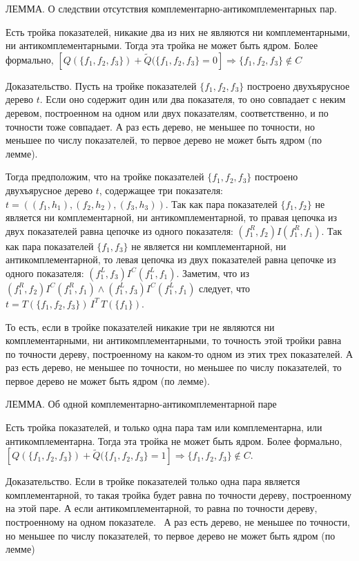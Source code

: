\documentclass[12pt]{a&t}
\begin{document}
ЛЕММА. О следствии отсутствия комплементарно-антикомплементарных пар.

Есть тройка показателей, никакие два из них не являются ни комплементарными, ни антикомплементарными. Тогда эта тройка не может быть ядром. Более формально, $[ Q(\{f_1, f_2, f_3\}) + \widetilde{Q}(\{f_1, f_2, f_3\} = 0] \Rightarrow \{f_1, f_2, f_3\} \not\in C  $


Доказательство. Пусть на тройке показателей $ \{f_1, f_2, f_3\} $ построено двухъярусное дерево $t$. Если оно содержит один или два показателя, то оно совпадает с неким деревом, построенном на одном или двух показателям, соответственно, и по точности тоже совпадает. А раз есть дерево, не меньшее по точности, но меньшее по числу показателей, то первое дерево не может быть ядром (по лемме).

Тогда предположим, что на тройке показателей $ \{f_1, f_2, f_3\} $ построено двухъярусное дерево $t$, содержащее три показателя: $ t = ((f_1, h_1), (f_2, h_2), (f_3, h_3))$. Так как пара показателей $\{ f_1, f_2 \}$ не является ни комплементарной, ни антикомплементарной, то правая цепочка из двух показателей равна цепочке из одного показателя: $(f_1^R, f_2)I(f_1^R, f_1)$. Так как пара показателей $\{ f_1, f_3 \}$ не является ни комплементарной, ни антикомплементарной, то левая цепочка из двух показателей равна цепочке из одного показателя: $(f_1^L, f_3)I^C(f_1^L, f_1)$. Заметим, что из $(f_1^R, f_2)I^C(f_1^R, f_1) \land (f_1^L, f_3)I^C(f_1^L, f_1)$ следует, что $t = T(\{f_1, f_2, f_3\}) \, I^T \, T(\{f_1\}) $.

То есть, если в тройке показателей никакие три не являются ни комплементарными, ни антикомплементарными, то точность этой тройки равна по точности дереву, построенному на каком-то одном из этих трех показателей. А раз есть дерево, не меньшее по точности, но меньшее по числу показателей, то первое дерево не может быть ядром (по лемме).


ЛЕММА. Об одной комплементарно-антикомплементарной паре

Есть тройка показателей, и только одна пара там или комплементарна, или антикомплементарна. Тогда эта тройка не может быть ядром. Более формально, $[ Q(\{f_1, f_2, f_3\}) + \widetilde{Q}(\{f_1, f_2, f_3\} = 1] \Rightarrow \{f_1, f_2, f_3\} \not\in C $.


Доказательство. Если в тройке показателей только одна пара является комплементарной, то такая тройка будет равна по точности дереву, построенному на этой паре. А если антикомплементарной, то равна по точности дереву, построенному на одном показателе.  А раз есть дерево, не меньшее по точности, но меньшее по числу показателей, то первое дерево не может быть ядром (по лемме)
\end{document}
